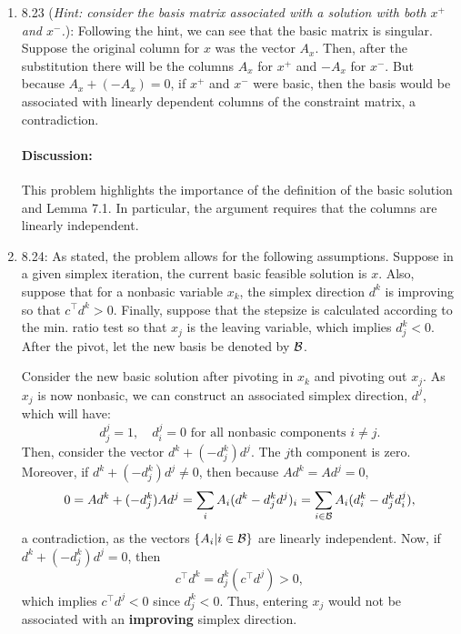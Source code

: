 \documentclass[10pt]{article}
\begin{document}
\begin{enumerate} 

\item 8.23 ({\it Hint: consider the basis matrix associated with a
    solution with both $x^+$ and $x^-$.}): Following the hint, we can
  see that the basic matrix is singular. Suppose the original column
  for $x$ was the vector $A_x$. Then, after the substitution there will
  be the columns $A_x$ for $x^+$ and $-A_x$ for $x^-$. But because
  $A_x + (-A_x) = 0$, if $x^+$ and $x^-$
  were basic, then the basis would be associated with linearly
  dependent columns of the constraint matrix, a contradiction.

  \medskip

  \paragraph{Discussion:} This problem highlights the importance of
  the definition of the basic solution and Lemma 7.1. In particular,
  the argument requires that the columns are linearly independent.

\item 8.24: As stated, the problem allows for the following
  assumptions.
  Suppose in a given simplex iteration, the current basic
  feasible solution is $x$. Also, suppose that for a
  nonbasic variable $x_k$, the simplex direction $d^k$ is improving so
  that $c^\top d^k > 0$. Finally, suppose that the stepsize is
  calculated according to the min. ratio test so that $x_j$ is the
  leaving variable, which implies $d^k_j < 0$. After the pivot, let the new basis
  be denoted by ${\cal B}$. 

  Consider the new basic solution after pivoting in $x_k$ and pivoting
  out $x_j$. As $x_j$ is now nonbasic, we can construct an associated
  simplex direction, $d^j$, which will have:
  \[
  d^j_j = 1, \quad d^j_i = 0 \mbox{ for all nonbasic components $i\not=j$.}  
  \]
  Then, consider the vector $d^k + (-d^k_j) d^j$. The $j$th component
  is zero. Moreover, if $d^k + (-d^k_j) d^j \not= 0$, then because $A d^k =
  A d^j = 0$, 
  \[
  0 = A d^k + (-d^k_j) A d^j = \sum_i A_i (d^k-d^k_j d^j)_i =
  \sum_{i \in {\cal B}} A_i (d^k_i - d^k_j d^j_i),
  \]
  a contradiction, as the vectors $\{A_i | i \in {\cal B}\}$ are linearly
  independent. Now, if $d^k + (-d^k_j) d^j = 0$, then 
  \[
  c^\top d^k = d^k_j (c^\top d^j) > 0,
  \]
which implies $c^\top d^j < 0$ since $d^k_j < 0$. Thus, entering $x_j$ would not be associated with an
  {\bf improving} simplex direction.


\end{enumerate}
\end{document}
